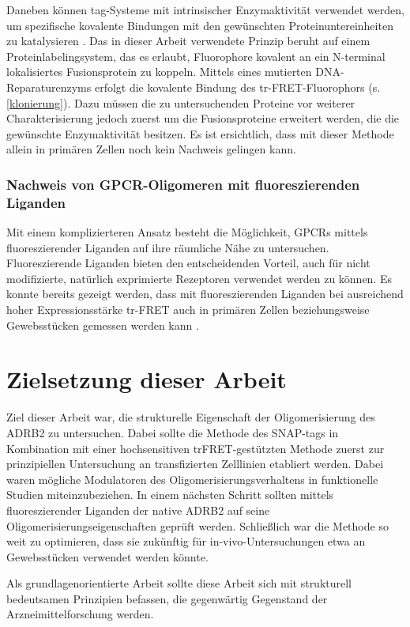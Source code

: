 Daneben können tag-Systeme mit intrinsischer Enzymaktivität verwendet werden, um spezifische kovalente Bindungen mit den gewünschten Proteinuntereinheiten zu katalysieren \parencite{Gautier2008}. Das in dieser Arbeit verwendete Prinzip beruht auf einem Proteinlabelingsystem, das es erlaubt, Fluorophore kovalent an ein N-terminal lokalisiertes Fusionsprotein zu koppeln. Mittels eines mutierten DNA-Reparaturenzyms erfolgt die kovalente Bindung des tr-FRET-Fluorophors (s. \ref{klonierung}). Dazu müssen die zu untersuchenden Proteine vor weiterer Charakterisierung jedoch zuerst um die Fusionsproteine erweitert werden, die die gewünschte Enzymaktivität besitzen. Es ist ersichtlich, dass mit dieser Methode allein in primären Zellen noch kein Nachweis gelingen kann.

\subsubsection{Nachweis von GPCR-Oligomeren mit fluoreszierenden Liganden}
Mit einem komplizierteren Ansatz besteht die Möglichkeit, GPCRs mittels fluoreszierender Liganden auf ihre räumliche Nähe zu untersuchen. Fluoreszierende Liganden bieten den entscheidenden Vorteil, auch für nicht modifizierte, natürlich exprimierte Rezeptoren verwendet werden zu können. Es konnte bereits gezeigt werden, dass mit fluoreszierenden Liganden bei ausreichend hoher Expressionsstärke tr-FRET auch in primären Zellen beziehungsweise Gewebsstücken gemessen werden kann \parencite{Albizu2010}.

\section{Zielsetzung dieser Arbeit}
Ziel dieser Arbeit war, die strukturelle Eigenschaft der Oligomerisierung des ADRB2 zu untersuchen. Dabei sollte die Methode des SNAP-tags in Kombination mit einer hochsensitiven trFRET-gestützten Methode zuerst zur prinzipiellen Untersuchung an transfizierten Zelllinien etabliert werden. Dabei waren mögliche Modulatoren des Oligomerisierungsverhaltens in funktionelle Studien miteinzubeziehen. In einem nächsten Schritt sollten mittels fluoreszierender Liganden der native ADRB2 auf seine Oligomerisierungseigenschaften geprüft werden. Schließlich war die Methode so weit zu optimieren, dass sie zukünftig für in-vivo-Untersuchungen etwa an Gewebsstücken verwendet werden könnte.

Als grundlagenorientierte Arbeit sollte diese Arbeit sich mit strukturell bedeutsamen Prinzipien befassen, die gegenwärtig Gegenstand der Arzneimittelforschung werden.  
